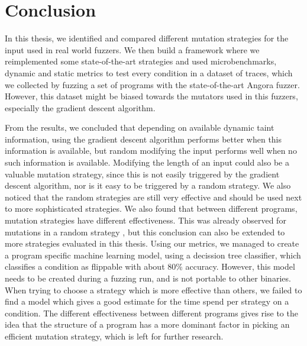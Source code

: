 
\chapter{Conclusion}\label{chap:conclusion} %





% 
In this thesis, we identified and compared different mutation strategies for the input used in real world fuzzers. We then build a framework where we reimplemented some state-of-the-art strategies and used microbenchmarks, dynamic and static metrics to test every condition in a dataset of traces, which we collected by fuzzing a set of programs with the state-of-the-art Angora fuzzer. However, this dataset might be biased towards the mutators used in this fuzzers, especially the gradient descent algorithm.

From the results, we concluded that depending on available dynamic taint information, using the gradient descent algorithm performs better when this information is available, but random modifying the input performs well when no such information is available. Modifying the length of an input could also be a valuable mutation strategy, since this is not easily triggered by the gradient descent algorithm, nor is it easy to be triggered by a random strategy. We also noticed that the random strategies are still very effective and should be used next to more sophisticated strategies.
We also found that between different programs, mutation strategies have different effectiveness. This was already observed for mutations in a random strategy \cite{lyu2019mopt}, but this conclusion can also be extended to more strategies evaluated in this thesis. 
Using our metrics, we managed to create a program specific machine learning model, using a decission tree classifier, which classifies a condition as flippable with about 80\% accuracy. However, this model needs to be created during a fuzzing run, and is not portable to other binaries.
When trying to choose a strategy which is more effective than others, we failed to find a model which gives a good estimate for the time spend per strategy on a condition.
The different effectiveness between different programs gives rise to the idea that the structure of a program has a more dominant factor in picking an efficient mutation strategy, which is left for further research.

